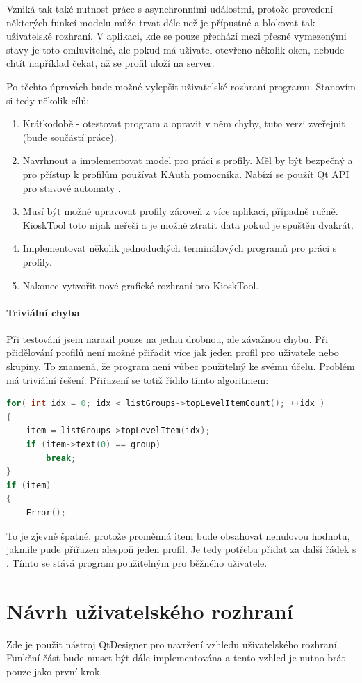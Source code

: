 Vzniká tak také nutnost práce s asynchronními událostmi, protože provedení některých funkcí modelu může trvat déle než je přípustné a blokovat tak uživatelské rozhraní. V aplikaci, kde se pouze přechází mezi přesně vymezenými stavy je toto omluvitelné, ale pokud má uživatel otevřeno několik oken, nebude chtít například čekat, až se profil uloží na server.

Po těchto úpravách bude možné vylepšit uživatelské rozhraní programu. Stanovím si tedy několik cílů:
\begin{enumerate}
\item Krátkodobě - otestovat program a opravit v něm chyby, tuto verzi zveřejnit (bude součástí práce).
\item Navrhnout a implementovat model pro práci s profily. Měl by být bezpečný a pro přístup k profilům používat KAuth pomocníka. Nabízí se použít Qt API pro stavové automaty \cite{QtStatMach}.
\item Musí být možné upravovat profily zároveň z více aplikací, případně ručně. KioskTool toto nijak neřeší a je možné ztratit data pokud je spuštěn dvakrát.
\item Implementovat několik jednoduchých terminálových programů pro práci s profily.
\item Nakonec vytvořit nové grafické rozhraní pro KioskTool.
\end{enumerate}

\paragraph{Triviální chyba}
Při testování jsem narazil pouze na jednu drobnou, ale závažnou chybu. Při přidělování profilů není možné přiřadit více jak jeden profil pro uživatele nebo skupiny. To znamená, že program není vůbec použitelný ke svému účelu. Problém má triviální řešení. Přiřazení se totiž řídilo tímto algoritmem:
\begin{lstlisting}[language=C++]
for( int idx = 0; idx < listGroups->topLevelItemCount(); ++idx )
{
    item = listGroups->topLevelItem(idx);
    if (item->text(0) == group)
        break;
}
if (item)
{
    Error();
\end{lstlisting}
To je zjevně špatné, protože proměnná item bude obsahovat nenulovou hodnotu, jakmile pude přiřazen alespoň jeden profil. Je tedy potřeba přidat za  další řádek s . Tímto se stává program použitelným pro běžného uživatele.

\section{Návrh uživatelského rozhraní}
Zde je použit nástroj QtDesigner pro navržení vzhledu uživatelského rozhraní. Funkční část bude muset být dále implementována a tento vzhled je nutno brát pouze jako první krok.

